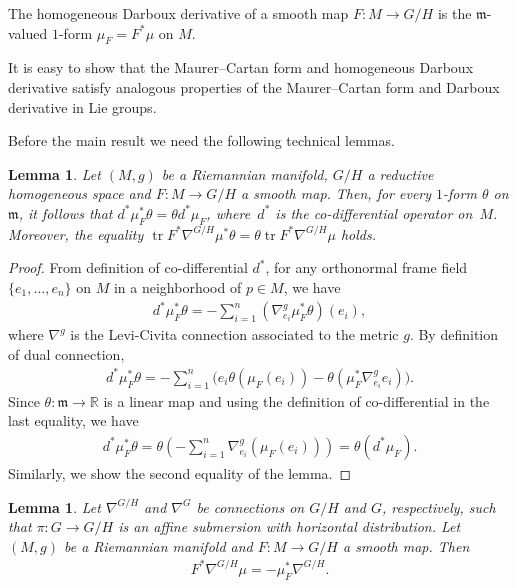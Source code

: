 \documentclass[10pt,a4paper]{amsart}
\numberwithin{equation}{section}
\newtheorem{Lemma}[Theorem]{Lemma}
\newcommand{\m}{\mathfrak{m}}
\begin{document}
\begin{Definition}
  The homogeneous Darboux derivative of a smooth map $F\colon M \rightarrow G/H$ is the $\m$-valued $1$-form $\mu_F = F^*\mu$ on $M$.
\end{Definition}

It is  easy to show that the Maurer--Cartan form and homogeneous Darboux derivative satisfy analogous properties of the Maurer--Cartan form and Darboux derivative in Lie groups.

Before the main result we need the following technical lemmas.

\begin{Lemma}\label{le3}
  Let $(M,g)$ be a Riemannian manifold, $G/H$ a reductive homogeneous space and $F\colon M \rightarrow G/H$ a smooth map. Then, for every $1$-form $\theta$ on $\mathfrak{m}$, it follows that $d^{*}\mu_{F}^{*}\theta =  \theta d^{*}\mu_{F}$, where~$d^{*}$ is the co-differential operator on~$M$. Moreover,
  the equality $\operatorname{tr}F^*\nabla^{G/H}\mu^{*}\theta = \theta \operatorname{tr}F^*\nabla^{G/H}\mu$ holds.
\end{Lemma}

\begin{proof}
  From def\/inition of co-dif\/ferential $d^{*}$, for any orthonormal frame f\/ield $\{e_{1},\ldots, e_{n}\}$ on $M$ in a neighborhood of $p \in M$, we have
  \begin{gather*}
    d^{*}\mu_{F}^*\theta = -\sum_{i=1}^{n} (\nabla^{g}_{e_{i}}\mu_{F}^{*}\theta)(e_{i}),
  \end{gather*}
  where $\nabla^{g}$ is the Levi-Civita connection associated to the metric $g$. By def\/inition of dual connection,
  \begin{gather*}
    d^{*}\mu_{F}^{*}\theta
 =  -\sum_{i=1}^{n}\big(e_{i}\theta(\mu_{F}(e_{i})) - \theta(\mu_{F}^{*}\nabla^{g}_{e_{i}}e_{i})\big).
  \end{gather*}
  Since $\theta\colon \mathfrak{m} \rightarrow \mathbb{R}$ is a linear map and using the def\/inition of co-dif\/ferential in the last equality, we
  have
  \begin{gather*}
    d^{*}\mu_{F}^{*}\theta = \theta\left(-\sum_{i=1}^{n}\nabla^{g}_{e_{i}}(\mu_{F}(e_{i}))\right) =
    \theta(d^{*}\mu_{F}).
  \end{gather*}
  Similarly, we  show the second equality of the lemma.
\end{proof}


\begin{Lemma}\label{changeofmu}
  Let $\nabla^{G/H}$ and $\nabla^{G}$ be connections on $G/H$ and $G$, respectively, such that $\pi \colon G \rightarrow G/H$ is an affine submersion with horizontal distribution. Let~$(M,g)$ be a Riemannian manifold and $F\colon M \rightarrow G/H$ a smooth map. Then
  \begin{gather*}%
    F^*\nabla^{G/H}\mu=  - \mu_{F}^*\nabla^{G/H}.
  \end{gather*}
\end{Lemma}
\end{document}
